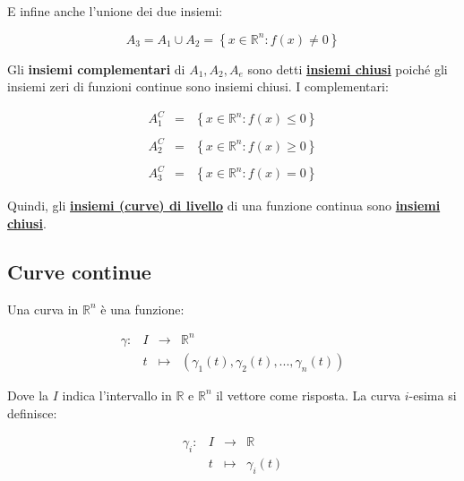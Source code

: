 \documentclass[a4paper]{article}
\begin{document}
	E infine anche l'unione dei due insiemi:
	
	\begin{equation*}
		A_{3} = A_{1} \cup A_{2} = \left\{x \in \mathbb{R}^{n} : f\left(x\right) \ne 0\right\}
	\end{equation*}
	
	\noindent
	Gli \textbf{insiemi complementari} di $A_{1}, A_{2}, A_{e}$ sono detti \textcolor{Red3}{\textbf{\underline{insiemi chiusi}}} poiché gli insiemi zeri di funzioni continue sono insiemi chiusi. I complementari:
	
	\begin{equation*}
		\begin{array}{lll}
			A_{1}^{C} & = & \left\{x \in \mathbb{R}^{n} : f\left(x\right) \le 0\right\} \\
			&& \\
			A_{2}^{C} & = & \left\{x \in \mathbb{R}^{n} : f\left(x\right) \ge 0\right\} \\
			&& \\
			A_{3}^{C} & = & \left\{x \in \mathbb{R}^{n} : f\left(x\right) = 0\right\}
		\end{array}
	\end{equation*}

	\noindent
	Quindi, gli \textcolor{Red3}{\textbf{\underline{insiemi (curve) di livello}}} di una funzione continua sono \textcolor{Red3}{\textbf{\underline{insiemi chiusi}}}.
	
	\newpage
	
	\subsection{Curve continue}
	
	Una curva in $\mathbb{R}^{n}$ è una funzione:
	
	\begin{equation*}
		\begin{array}{llll}
			\gamma: & I & \longrightarrow & \mathbb{R}^{n} \\
					& t & \longmapsto	  & \left(\gamma_{1}\left(t\right), \gamma_{2}\left(t\right), ..., \gamma_{n}\left(t\right)\right)
		\end{array}
	\end{equation*}

	\noindent
	Dove la $I$ indica l'intervallo in $\mathbb{R}$ e $\mathbb{R}^{n}$ il vettore come risposta. La curva $i$-esima si definisce:
	
	\begin{equation*}
		\begin{array}{llll}
			\gamma_{i}: & I & \longrightarrow & \mathbb{R} \\
			& t & \longmapsto	  & \gamma_{i}\left(t\right)
		\end{array}
	\end{equation*}
\end{document}
